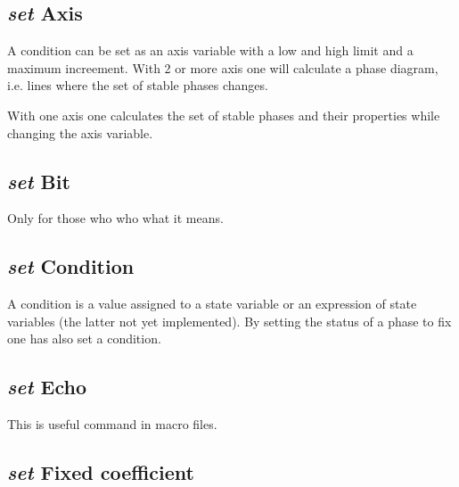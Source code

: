 \documentclass[12pt]{article}
\begin{document}
\subsection{{\em set} Axis}

A condition can be set as an axis variable with a low and high limit
and a maximum increement.  With 2 or more axis one will calculate a
phase diagram, i.e. lines where the set of stable phases changes.

With one axis one calculates the set of stable phases and their
properties while changing the axis variable.

\subsection{{\em set} Bit}

Only for those who who what it means.

\subsection{{\em set} Condition}

A condition is a value assigned to a state variable or an expression
of state variables (the latter not yet implemented).  By setting the
status of a phase to fix one has also set a condition.

\subsection{{\em set} Echo}

This is useful command in macro files.

\subsection{{\em set} Fixed coefficient}
\end{document}
